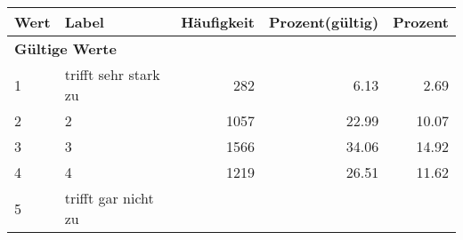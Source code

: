      \begin{longtable}{lXrrr}
     \toprule
     \textbf{Wert} & \textbf{Label} & \textbf{Häufigkeit} & \textbf{Prozent(gültig)} & \textbf{Prozent} \\
     \endhead
     \midrule
     \multicolumn{5}{l}{\textbf{Gültige Werte}}\\

     1 &
     \multicolumn{1}{X}{ trifft sehr stark zu   } &


       \num{282} &
       \num[round-mode=places,round-precision=2]{6,13} &
         \num[round-mode=places,round-precision=2]{2,69} \\

     2 &
     \multicolumn{1}{X}{ 2   } &


       \num{1057} &
       \num[round-mode=places,round-precision=2]{22,99} &
         \num[round-mode=places,round-precision=2]{10,07} \\

     3 &
     \multicolumn{1}{X}{ 3   } &


       \num{1566} &
       \num[round-mode=places,round-precision=2]{34,06} &
         \num[round-mode=places,round-precision=2]{14,92} \\

     4 &
     \multicolumn{1}{X}{ 4   } &


       \num{1219} &
       \num[round-mode=places,round-precision=2]{26,51} &
         \num[round-mode=places,round-precision=2]{11,62} \\

     5 &
     \multicolumn{1}{X}{ trifft gar nicht zu   } &



\end{longtable}
